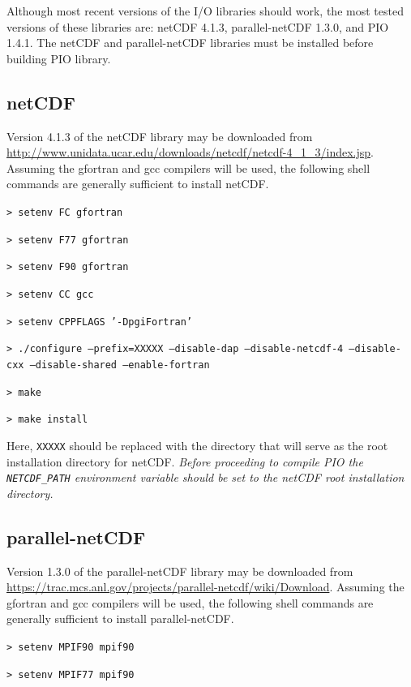 \documentclass[11pt]{report}
\begin{document}
Although most recent versions of the I/O libraries should work, the most tested versions of these libraries are: netCDF 4.1.3, parallel-netCDF 1.3.0, and PIO 1.4.1. The netCDF and parallel-netCDF libraries must be installed before building PIO library.

\subsection{netCDF}

Version 4.1.3 of the netCDF library may be downloaded from \url{http://www.unidata.ucar.edu/downloads/netcdf/netcdf-4\_1\_3/index.jsp}.
Assuming the gfortran and gcc compilers will be used, the following shell commands are generally sufficient to install netCDF.

\vspace{12pt}
{\tt > setenv FC gfortran}

{\tt > setenv F77 gfortran} 

{\tt > setenv F90 gfortran}

{\tt > setenv CC gcc} 

{\tt > setenv CPPFLAGS '-DpgiFortran'} 

{\tt > ./configure --prefix=XXXXX --disable-dap --disable-netcdf-4 --disable-cxx \hfill\break --disable-shared --enable-fortran} 

{\tt > make}

{\tt > make install}
\vspace{12pt}

Here, {\tt XXXXX} should be replaced with the directory that will serve as the root installation directory for netCDF.
{\em Before proceeding to compile PIO the {\tt NETCDF\_PATH} environment variable should be set to the netCDF root installation directory.}


\subsection{parallel-netCDF}

Version 1.3.0 of the parallel-netCDF library may be downloaded from \url{https://trac.mcs.anl.gov/projects/parallel-netcdf/wiki/Download}.
Assuming the gfortran and gcc compilers will be used, the following shell commands are generally sufficient to install parallel-netCDF.

\vspace{12pt}
{\tt > setenv MPIF90 mpif90}

{\tt > setenv MPIF77 mpif90} 
\end{document}
